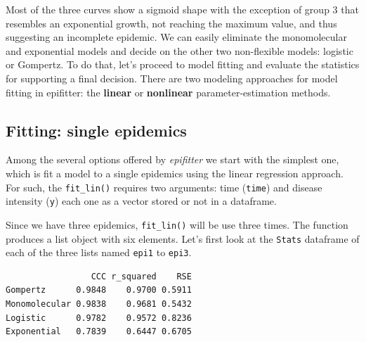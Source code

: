 \documentclass[
  letterpaper,
  DIV=11,
  numbers=noendperiod]{scrreprt}
\newenvironment{Shaded}{\begin{snugshade}}{\end{snugshade}}
\newcommand{\AttributeTok}[1]{\textcolor[rgb]{0.40,0.45,0.13}{#1}}
\newcommand{\FunctionTok}[1]{\textcolor[rgb]{0.28,0.35,0.67}{#1}}
\newcommand{\NormalTok}[1]{\textcolor[rgb]{0.00,0.23,0.31}{#1}}
\newcommand{\OtherTok}[1]{\textcolor[rgb]{0.00,0.23,0.31}{#1}}
\newcommand{\SpecialCharTok}[1]{\textcolor[rgb]{0.37,0.37,0.37}{#1}}
\newcommand{\StringTok}[1]{\textcolor[rgb]{0.13,0.47,0.30}{#1}}
\begin{document}
Most of the three curves show a sigmoid shape with the exception of
group 3 that resembles an exponential growth, not reaching the maximum
value, and thus suggesting an incomplete epidemic. We can easily
eliminate the monomolecular and exponential models and decide on the
other two non-flexible models: logistic or Gompertz. To do that, let's
proceed to model fitting and evaluate the statistics for supporting a
final decision. There are two modeling approaches for model fitting in
epifitter: the \textbf{linear} or \textbf{nonlinear}
parameter-estimation methods.

\hypertarget{fitting-single-epidemics}{%
\subsection{Fitting: single epidemics}\label{fitting-single-epidemics}}

Among the several options offered by \emph{epifitter} we start with the
simplest one, which is fit a model to a single epidemics using the
linear regression approach. For such, the \texttt{fit\_lin()} requires
two arguments: time (\texttt{time}) and disease intensity (\texttt{y})
each one as a vector stored or not in a dataframe.

Since we have three epidemics, \texttt{fit\_lin()} will be use three
times. The function produces a list object with six elements. Let's
first look at the \texttt{Stats} dataframe of each of the three lists
named \texttt{epi1} to \texttt{epi3}.

\begin{Shaded}
\end{Shaded}

\begin{verbatim}
                 CCC r_squared    RSE
Gompertz      0.9848    0.9700 0.5911
Monomolecular 0.9838    0.9681 0.5432
Logistic      0.9782    0.9572 0.8236
Exponential   0.7839    0.6447 0.6705
\end{verbatim}
\end{document}

